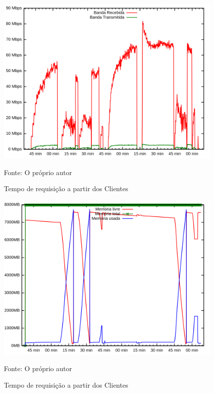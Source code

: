 \begin{figure}[htb!]
    \caption{Tempo de requisição a partir dos Clientes}
    \includegraphics[width=\textwidth]{metricas_rudy_t3/io.png}
    \centering
    
    Fonte: O próprio autor
\end{figure}

\begin{figure}[htb!]
    \caption{Tempo de requisição a partir dos Clientes}
    \includegraphics[width=\textwidth]{metricas_rudy_t3/memory.png}
    \centering
    
    Fonte: O próprio autor
\end{figure}
